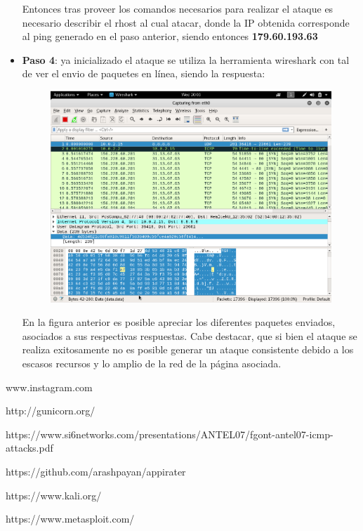 \documentclass[a4paper,11pt]{article}
\theoremstyle{mytheor}
\begin{document}
\begin{itemize}
 
Entonces tras proveer los comandos necesarios para realizar el ataque es necesario describir el rhost al cual atacar, donde la IP obtenida corresponde al ping generado en el paso anterior, siendo entonces \textbf{179.60.193.63}
 
  \item \textbf{Paso 4}: ya inicializado el ataque se utiliza la herramienta wireshark con tal de ver el envio de paquetes en línea, siendo la respuesta:
  
  \newpage
  
  \begin{figure}[!h]
    \centering
    \includegraphics[scale=0.5]{wireshark.png}
    \label{fig:my_label}
  \end{figure}
  
 En la figura anterior es posible apreciar los diferentes paquetes enviados, asociados a sus respectivas respuestas. Cabe destacar, que si bien el ataque se realiza exitosamente no es posible generar un ataque consistente debido a los escasos recursos y lo amplio de la red de la página asociada. 
    
  
\end{itemize}





\newpage










\begin{thebibliography}{1}
www.instagram.com

http://gunicorn.org/

https://www.si6networks.com/presentations/ANTEL07/fgont-antel07-icmp-attacks.pdf

https://github.com/arashpayan/appirater

https://www.kali.org/

https://www.metasploit.com/

\end{thebibliography}

\newpage
\end{document}
